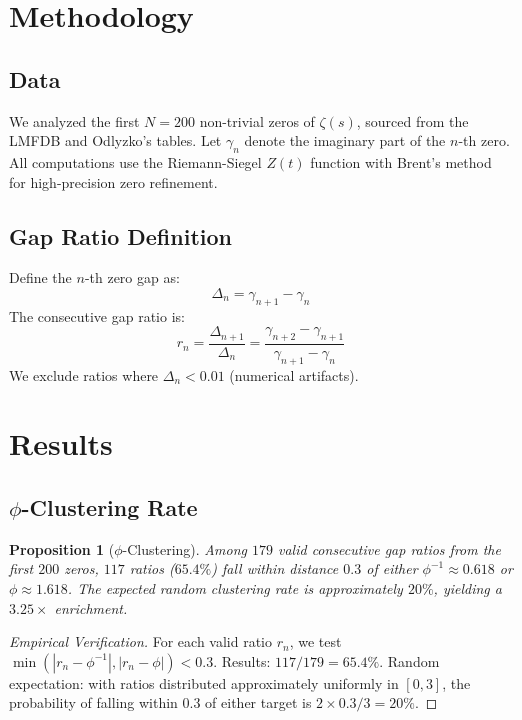 \documentclass[11pt,a4paper]{article}
\newtheorem{proposition}[theorem]{Proposition}
\begin{document}
\section{Methodology}

\subsection{Data}

We analyzed the first $N = 200$ non-trivial zeros of $\zeta(s)$, sourced from the LMFDB and Odlyzko's tables. Let $\gamma_n$ denote the imaginary part of the $n$-th zero. All computations use the Riemann-Siegel $Z(t)$ function with Brent's method for high-precision zero refinement.

\subsection{Gap Ratio Definition}

Define the $n$-th zero gap as:
\begin{equation}
\Delta_n = \gamma_{n+1} - \gamma_n
\end{equation}
The consecutive gap ratio is:
\begin{equation}
r_n = \frac{\Delta_{n+1}}{\Delta_n} = \frac{\gamma_{n+2} - \gamma_{n+1}}{\gamma_{n+1} - \gamma_n}
\end{equation}
We exclude ratios where $\Delta_n < 0.01$ (numerical artifacts).

\section{Results}

\subsection{$\phi$-Clustering Rate}

\begin{proposition}[$\phi$-Clustering]
\label{prop:clustering}
Among $179$ valid consecutive gap ratios from the first $200$ zeros, $117$ ratios ($65.4\%$) fall within distance $0.3$ of either $\phi^{-1} \approx 0.618$ or $\phi \approx 1.618$. The expected random clustering rate is approximately $20\%$, yielding a $3.25\times$ enrichment.
\end{proposition}

\begin{proof}[Empirical Verification]
For each valid ratio $r_n$, we test $\min(|r_n - \phi^{-1}|, |r_n - \phi|) < 0.3$. Results: $117/179 = 65.4\%$. Random expectation: with ratios distributed approximately uniformly in $[0, 3]$, the probability of falling within $0.3$ of either target is $2 \times 0.3 / 3 = 20\%$.
\end{proof}
\end{document}
